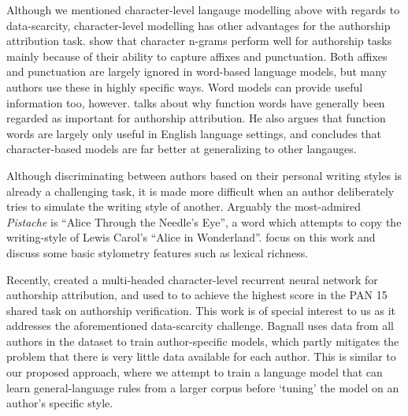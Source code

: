 Although we mentioned character-level langauge modelling above with regards to data-scarcity, character-level modelling has other advantages for the authorship attribution task. 
\citep{sapkota2015not} show that character n-grams perform well for authorship tasks mainly because of their ability to capture affixes and punctuation.
Both affixes and punctuation are largely ignored in word-based language models, but many authors use these in highly specific ways. Word models can provide useful information too, however. \citep{kestemont2014function} talks about why function words have generally been regarded as important for authorship attribution.
He also argues that function words are largely only useful in English language settings, and concludes that character-based models are far better at generalizing to other langauges.

Although discriminating between authors based on their personal writing styles is already a challenging task, it is made more difficult when an author deliberately tries to simulate the writing style of another. Arguably the most-admired \textit{Pistache} is ``Alice Through the Needle's Eye'', a word which attempts to copy the writing-style of Lewis Carol's ``Alice in Wonderland''. \citep{somers2003authorship} focus on this work and discuss some basic stylometry features such as lexical richness.

Recently, \citep{bagnall2015author} created a multi-headed character-level recurrent neural network for authorship attribution, and used to to achieve the highest score in the PAN 15 shared task on authorship verification. This work is of special interest to us as it addresses the aforementioned data-scarcity challenge. Bagnall uses data from all authors in the dataset to train author-specific models, which partly mitigates the problem that there is very little data available for each author. This is similar to our proposed approach, where we attempt to train a language model that can learn general-language rules from a larger corpus before `tuning' the model on an author's specific style.

